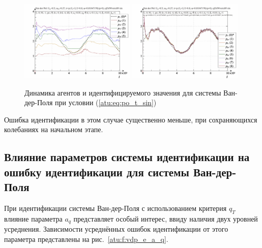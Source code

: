 \begin{figure}[ht!]
\begin{center}
  \includegraphics[width=0.49\textwidth]{p/cha/vdp/vdp_id-p_t_pi_ql3rlWvnAAW_sin.png}
  \hfill
  \includegraphics[width=0.49\textwidth]{p/cha/vdp/vdp_id-p_t_p_ql3rlWvnAAW_sin.png}
\end{center}
  \caption{Динамика агентов и идентифицируемого значения для системы Ван-дер-Поля при условии (\ref{atu:eq:po_t_sin})}
\label{atu:f:vdp_id1_sin}
\end{figure}

Ошибка идентификации в этом случае существенно меньше, при сохраняющихся
колебаниях на начальном этапе.



\subsection{Влияние параметров системы идентификации на ошибку идентификации для системы Ван-дер-Поля}  %

При идентификации системы Ван-дер-Поля
с использованием критерия $q_T$
влияние параметра $a_q$ представляет
особый интерес, ввиду наличия двух уровней усреднения.
Зависимости усреднённых ошибок идентификации
от этого параметра представлены на  рис.~\ref{atu:f:vdp_e_a_q}.

